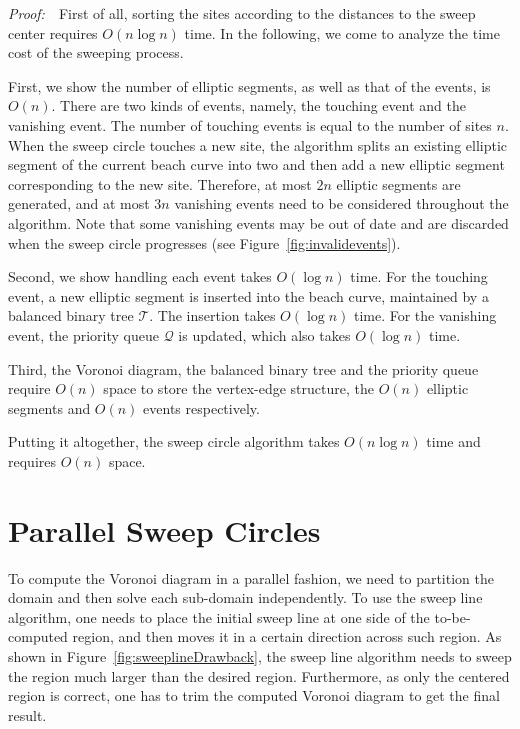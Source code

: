 {{\vspace{0.1in}\noindent\textit{Proof:}~~First of all, sorting the sites according to
the distances to the sweep center requires $O(n\log n)$ time. In the following, we come to analyze the time cost of the sweeping process.

First, we show the number of
elliptic segments, as well as that of the events, is $O(n)$. There
are two kinds of events, namely, the touching event and the
vanishing event. The number of touching events is equal to the
number of sites $n$. When the sweep circle touches a new site, the
algorithm splits an existing elliptic segment of the current beach
curve into two and then add a new elliptic segment corresponding to
the new site. Therefore, at most $2n$ elliptic segments are
generated, and at most $3n$ vanishing events need to be considered
throughout the algorithm. Note that some vanishing events may be
out of date and are discarded when the sweep circle progresses (see
Figure~\ref{fig:invalidevents}).

Second, we show handling each event takes $O(\log n)$ time. For the
touching event, a new elliptic segment is inserted into the beach
curve, maintained by a balanced binary tree $\mathcal T$. The
insertion takes $O(\log n)$ time. For the vanishing event, the
priority queue $\mathcal Q$ is updated, which also takes $O(\log n)$
time.

Third, the Voronoi diagram, the balanced binary tree and the priority queue require
$O(n)$ space to store the vertex-edge structure, the $O(n)$ elliptic segments and $O(n)$
events respectively.

Putting it altogether, the sweep circle algorithm takes $O(n\log
n)$ time and requires $O(n)$ space. %

\vspace{-0.1in}
\section{Parallel Sweep Circles}\label{sec:sweepcircle-parallel}
\vspace{-0.1in} To compute the Voronoi diagram in a parallel
fashion, we need to partition the domain and then solve each
sub-domain independently. To use the sweep line algorithm, one needs
to place the initial sweep line at one side of the to-be-computed
region, and then moves it in a certain direction across such region.
As shown in Figure~\ref{fig:sweeplineDrawback}, the sweep line
algorithm needs to sweep the region much larger than the desired
region. Furthermore, as only the centered region is correct, one has
to trim the computed Voronoi diagram to get the final result.

}}
